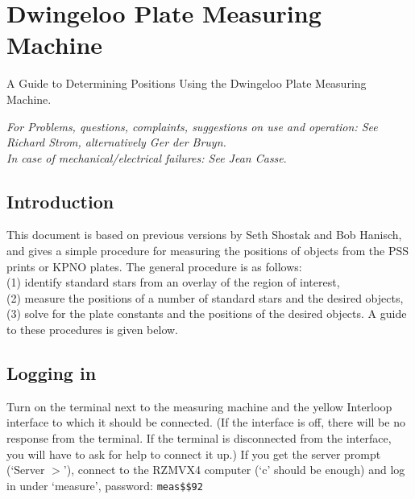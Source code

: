 



\chapter{ Dwingeloo Plate Measuring Machine} 


A \NEWSTAR Guide to Determining Positions Using the Dwingeloo Plate Measuring
Machine. 



{\it For Problems, questions, complaints, suggestions on use and operation: See
Richard Strom, alternatively Ger der Bruyn. \\ In case of mechanical/electrical
failures: See Jean Casse}. 



\section{Introduction} 
\label{.intro} 

This document is based on previous versions by Seth Shostak and Bob Hanisch,
and gives a simple procedure for measuring the positions of objects from the
PSS prints or KPNO plates.  The general procedure is as follows: 
\\(1) identify standard stars from an overlay of the region of interest, 
\\(2) measure the positions of a number of standard stars and the desired
objects, 
\\(3) solve for the plate constants and the positions of the desired objects. A
guide to these procedures is given below. 


\section{Logging in} 
\label{.login} 

Turn on the terminal next to the measuring machine and the yellow Interloop
interface to which it should be connected. (If the interface is off, there will
be no response from the terminal. If the terminal is disconnected from the
interface, you will have to ask for help to connect it up.) If you get the
server prompt (`Server $>$'), connect to the RZMVX4 computer (`c' should be
enough) and log in under `measure', password: \verb/meas$$92/ 

